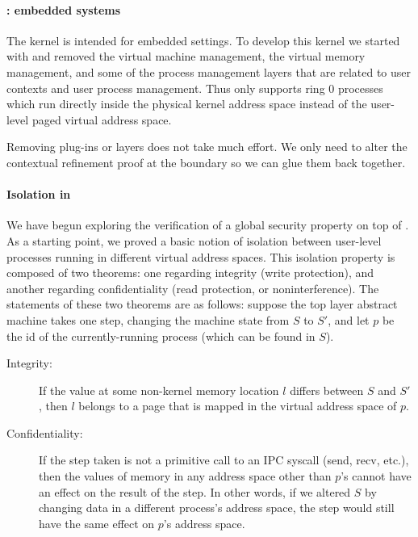 \paragraph{\mCTOSembed{}: embedded systems}
The \mCTOSembed{} kernel is intended for embedded settings. To develop
this kernel we started with \mCTOSringz{} and removed the virtual machine management, the virtual
memory management, and some of the process management layers that are
related to user contexts and user process management.  Thus
\mCTOSembed{} only supports ring 0 processes which run directly inside
the physical kernel address space instead of the user-level paged
virtual address space.

Removing plug-ins or layers does not take much effort.
We only need to alter the contextual refinement proof 
at the boundary so we can glue them back together.

\paragraph{Isolation in \mCTOSbase{}}
\label{security}
We have begun exploring the verification of a global security 
property on top of \mCTOSbase{}. As a starting point, we proved a basic notion of 
isolation between user-level processes running in different virtual 
address spaces. This isolation property is composed of two theorems:
one regarding integrity (write protection), and another regarding
confidentiality (read protection, or noninterference). 
The statements of these two theorems are as follows:
suppose the top layer abstract machine takes
one step, changing the machine state from $S$ to
$S'$, and let $p$ be the id of the currently-running process 
(which can be found in $S$).
\begin{description}
  \item[Integrity:]
If the value at some non-kernel memory location $l$ differs between
$S$ and $S'$, then $l$ belongs to a page that is mapped in the 
virtual address space of $p$.
\item[Confidentiality:]
\label{confidential}
If the step taken
is not a primitive call to an IPC syscall (send, recv, etc.), then the values
of memory in any address space other than $p$'s cannot have an effect on the
result of the step. In other words, if we altered $S$ 
by changing data in a different process's address space, the step would still 
have the same effect on $p$'s address space.
\end{description}

